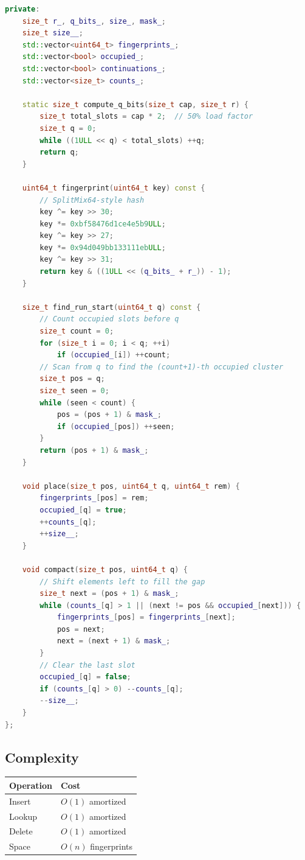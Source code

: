 \begin{lstlisting}[language=C++]
private:
    size_t r_, q_bits_, size_, mask_;
    size_t size__;
    std::vector<uint64_t> fingerprints_;
    std::vector<bool> occupied_;
    std::vector<bool> continuations_;
    std::vector<size_t> counts_;

    static size_t compute_q_bits(size_t cap, size_t r) {
        size_t total_slots = cap * 2;  // 50% load factor
        size_t q = 0;
        while ((1ULL << q) < total_slots) ++q;
        return q;
    }

    uint64_t fingerprint(uint64_t key) const {
        // SplitMix64-style hash
        key ^= key >> 30;
        key *= 0xbf58476d1ce4e5b9ULL;
        key ^= key >> 27;
        key *= 0x94d049bb133111ebULL;
        key ^= key >> 31;
        return key & ((1ULL << (q_bits_ + r_)) - 1);
    }

    size_t find_run_start(uint64_t q) const {
        // Count occupied slots before q
        size_t count = 0;
        for (size_t i = 0; i < q; ++i)
            if (occupied_[i]) ++count;
        // Scan from q to find the (count+1)-th occupied cluster
        size_t pos = q;
        size_t seen = 0;
        while (seen < count) {
            pos = (pos + 1) & mask_;
            if (occupied_[pos]) ++seen;
        }
        return (pos + 1) & mask_;
    }

    void place(size_t pos, uint64_t q, uint64_t rem) {
        fingerprints_[pos] = rem;
        occupied_[q] = true;
        ++counts_[q];
        ++size__;
    }

    void compact(size_t pos, uint64_t q) {
        // Shift elements left to fill the gap
        size_t next = (pos + 1) & mask_;
        while (counts_[q] > 1 || (next != pos && occupied_[next])) {
            fingerprints_[pos] = fingerprints_[next];
            pos = next;
            next = (next + 1) & mask_;
        }
        // Clear the last slot
        occupied_[q] = false;
        if (counts_[q] > 0) --counts_[q];
        --size__;
    }
};
\end{lstlisting}

\subsection{Complexity}

\begin{center}
\begin{tabular}{ll}
\toprule
Operation & Cost \\
\midrule
Insert & $O(1)$ amortized \\
Lookup & $O(1)$ amortized \\
Delete & $O(1)$ amortized \\
Space & $O(n)$ fingerprints \\
\bottomrule
\end{tabular}
\end{center}

